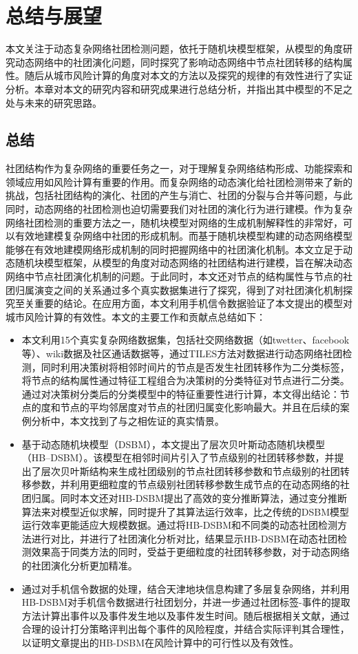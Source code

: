 
\chapter{总结与展望}

本文关注于动态复杂网络社团检测问题，依托于随机块模型框架，从模型的角度研究动态网络中的社团演化问题，同时探究了影响动态网络中节点社团转移的结构属性。随后从城市风险计算的角度对本文的方法以及探究的规律的有效性进行了实证分析。本章对本文的研究内容和研究成果进行总结分析，并指出其中模型的不足之处与未来的研究思路。
\section{总结}
社团结构作为复杂网络的重要任务之一，对于理解复杂网络结构形成、功能探索和领域应用如风险计算有重要的作用。而复杂网络的动态演化给社团检测带来了新的挑战，包括社团结构的演化、社团的产生与消亡、社团的分裂与合并等问题，与此同时，动态网络的社团检测也迫切需要我们对社团的演化行为进行建模。作为复杂网络社团检测的重要方法之一，随机块模型对网络的生成机制解释性的非常好，可以有效地建模复杂网络中社团的形成机制。而基于随机块模型构建的动态网络模型能够在有效地建模网络形成机制的同时把握网络中的社团演化机制。本文立足于动态随机块模型框架，从模型的角度对动态网络的社团结构进行建模，旨在解决动态网络中节点社团演化机制的问题。于此同时，本文还对节点的结构属性与节点的社团归属演变之间的关系通过多个真实数据集进行了探究，得到了对社团演化机制探究至关重要的结论。在应用方面，本文利用手机信令数据验证了本文提出的模型对城市风险计算的有效性。本文的主要工作和贡献点总结如下：
\begin{itemize}
	\item 本文利用15个真实复杂网络数据集，包括社交网络数据（如twetter、facebook等）、wiki数据及社区通话数据等，通过TILES方法对数据进行动态网络社团检测，同时利用决策树将相邻时间片的节点是否发生社团转移作为二分类标签，将节点的结构属性通过特征工程组合为决策树的分类特征对节点进行二分类。通过对决策树分类后的分类模型中的特征重要性进行计算，本文得出结论：节点的度和节点的平均邻居度对节点的社团归属变化影响最大。并且在后续的案例分析中，本文找到了与之相佐证的真实情景。
	\item 基于动态随机块模型（DSBM），本文提出了层次贝叶斯动态随机块模型（HB--DSBM）。该模型在相邻时间片引入了节点级别的社团转移参数，并提出了层次贝叶斯结构来生成社团级别的节点社团转移参数和节点级别的社团转移参数，并利用更细粒度的节点级别社团转移参数生成节点的在动态网络的社团归属。同时本文还对HB-DSBM提出了高效的变分推断算法，通过变分推断算法来对模型近似求解，同时提升了其算法运行效率，比之传统的DSBM模型运行效率更能适应大规模数据。通过将HB-DSBM和不同类的动态社团检测方法进行对比，并进行了社团演化分析对比，结果显示HB-DSBM在动态社团检测效果高于同类方法的同时，受益于更细粒度的社团转移参数，对于动态网络的社团演化分析更加精准。
	\item 通过对手机信令数据的处理，结合天津地块信息构建了多层复杂网络，并利用HB-DSBM对手机信令数据进行社团划分，并进一步通过社团标签-事件的提取方法计算出事件以及事件发生地以及事件发生时间。随后根据相关文献，通过合理的设计打分策略评判出每个事件的风险程度，并结合实际评判其合理性，以证明文章提出的HB-DSBM在风险计算中的可行性以及有效性。
\end{itemize}

